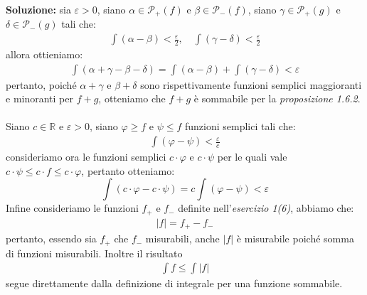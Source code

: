 \documentclass{article}
\numberwithin{equation}{subsection}
\begin{document}
\textbf{Soluzione:} sia $\varepsilon > 0$, siano $\alpha \in \mathcal{P}_+(f)$ e $\beta \in \mathcal{P}_-(f)$, siano $\gamma \in \mathcal{P}_+(g)$ e $\delta \in \mathcal{P}_-(g)$ tali che:
\begin{gather*}
    \int (\alpha - \beta) < \frac{\varepsilon}{2}, \quad \int (\gamma - \delta) < \frac{\varepsilon}{2} 
\end{gather*}
allora ottieniamo:
\begin{gather*}
    \int (\alpha + \gamma - \beta - \delta) = \int (\alpha - \beta) + \int (\gamma - \delta) < \varepsilon 
\end{gather*}
pertanto, poiché $\alpha + \gamma$ e $\beta + \delta$ sono rispettivamente funzioni semplici maggioranti e minoranti per $f + g$, otteniamo che $f + g$ è sommabile per la \textit{proposizione 1.6.2}. \\ \\
Siano $c \in \mathbb{R}$ e $\varepsilon > 0$, siano $\varphi \geq f$ e $\psi \leq f$ funzioni semplici tali che:
\begin{gather*}
    \int (\varphi - \psi) < \frac{\varepsilon}{c} 
\end{gather*}
consideriamo ora le funzioni semplici $c \cdot \varphi$ e $c \cdot \psi$ per le quali vale $c \cdot \psi \leq c \cdot f \leq c \cdot \varphi$, pertanto otteniamo:
\begin{equation*}
    \int (c \cdot \varphi - c \cdot \psi) = c \int (\varphi - \psi) < \varepsilon 
\end{equation*}
Infine consideriamo le funzioni $f_+$ e $f_-$ definite nell'\textit{esercizio 1(6)}, abbiamo che:
\begin{gather*}
    | f | = f_+ - f_- 
\end{gather*}
pertanto, essendo sia $f_+$ che $f_-$ misurabili, anche $|f|$ è misurabile poiché somma di funzioni misurabili. Inoltre il risultato
\begin{gather*}
    \int f \leq \int |f| 
\end{gather*}
segue direttamente dalla definizione di integrale per una funzione sommabile. \newpage
\end{document}
